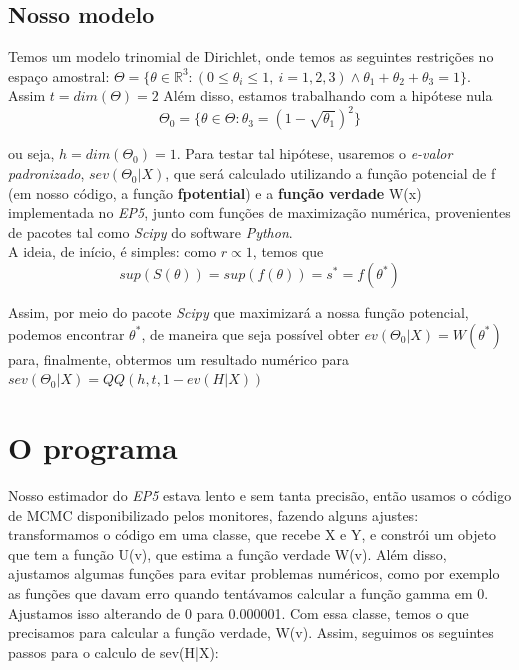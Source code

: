 \documentclass[11pt, a4paper]{article}
\begin{document}
\subsection{Nosso modelo}
Temos um modelo trinomial de Dirichlet, onde temos as seguintes restrições no espaço amostral:
$\Theta =  \{ \theta \in \mathbb{R}^3 : (0 \leq \theta_i \leq 1, \ i = 1,2,3 ) \wedge \theta_1+\theta_2+\theta_3 =1 \} $. Assim $t = dim(\Theta) = 2$
Além disso, estamos trabalhando com a hipótese  nula
$$\Theta_0 = \{ \theta \in \Theta : \theta_3 =(1 - \sqrt{\theta_1})^2\} $$

ou seja, $ h = dim(\Theta_0) = 1$. Para testar tal hipótese, usaremos o \textit{e-valor padronizado}, $sev(\Theta_0|X)$, que será calculado utilizando a função potencial de f (em nosso código, a função \textbf{fpotential}) e a \textbf{função verdade} W(x) implementada no \textit{EP5}, junto com funções de maximização numérica, provenientes de pacotes tal como \textit{Scipy} do software \textit{Python}.  \\
A ideia, de início, é simples: como $r \propto 1$, temos que $$sup(S(\theta)) = sup(f(\theta)) = s^* = f(\theta^*)$$ 

Assim, por meio do pacote \textit{Scipy} que maximizará a nossa função potencial, podemos encontrar $\theta^*$, de maneira que seja possível obter $ev(\Theta_0|X)=W(\theta^*) $ para, finalmente, obtermos um resultado numérico para $sev(\Theta_0|X)= QQ(h,t, 1-ev(H|X)) $

\section{O programa}
Nosso estimador do \textit{EP5} estava lento e sem tanta precisão, então usamos o código de MCMC disponibilizado pelos monitores, fazendo alguns ajustes: transformamos o código em uma classe, que recebe X e Y, e constrói um objeto que tem a função U(v), que estima a função verdade W(v). Além disso, ajustamos algumas funções para evitar problemas numéricos, como por exemplo as funções que davam erro quando tentávamos calcular a função gamma em 0. Ajustamos isso alterando de 0 para 0.000001. Com essa classe, temos o que precisamos para calcular a função verdade, W(v). Assim, seguimos os seguintes passos para o calculo de sev(H|X): 
\end{document}
